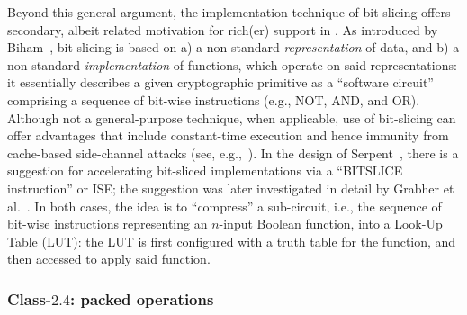Beyond this general argument, the implementation technique of bit-slicing
offers secondary, albeit related motivation for rich(er) support in \XCID.
As introduced by Biham~\cite{SCARV:Biham:97}, bit-slicing is based on
a) a non-standard {\em representation} of data,
   and
b) a non-standard {\em implementation} of functions, which operate on
   said representations:
it essentially describes a given cryptographic primitive as a  ``software 
circuit'' comprising a sequence of bit-wise instructions (e.g., NOT, AND, 
and OR).  Although not a general-purpose technique, when applicable, use
of bit-slicing can offer advantages that include constant-time execution 
and hence immunity from cache-based side-channel attacks
(see, e.g.,~\cite{SCARV:KasSch:09}).
In the design of Serpent~\cite[Page 232]{SCARV:BihAndKnu:98}, there is a
suggestion for accelerating bit-sliced implementations via a ``BITSLICE 
instruction'' or ISE; the suggestion was later investigated in detail by 
Grabher et al.~\cite{SCARV:GraGroPag:08}.  In both cases, the idea is to 
``compress'' a sub-circuit, i.e., the sequence of bit-wise instructions 
representing an $n$-input Boolean function, into a Look-Up Table (LUT): 
the LUT is first configured with a truth table for the function, and then 
accessed to apply said function.  


\subsubsection{Class-$2.4$: packed                  operations}
\label{sec:bg:feature:2:4}

%
%
%
%

